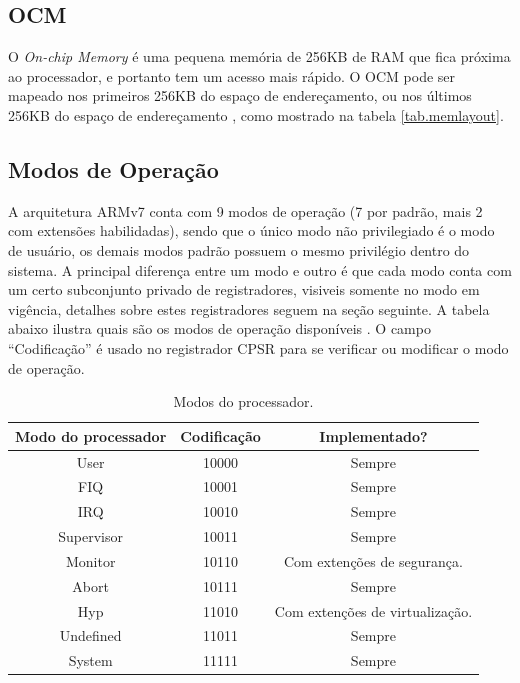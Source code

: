 \documentclass{ufscThesis/ufscThesis} %
\begin{document}
\subsection{OCM} O \emph{On-chip Memory} é uma pequena memória de 256KB de RAM que fica próxima ao processador, e portanto tem um acesso mais rápido. O OCM pode ser mapeado nos primeiros 256KB do espaço de endereçamento, ou nos últimos 256KB do espaço de endereçamento \cite{ug585}, como mostrado na tabela \ref{tab.memlayout}.


\subsection{Modos de Operação}
\label{sec:operating_modes}
A arquitetura ARMv7 conta com 9 modos de operação (7 por padrão, mais 2 com extensões habilidadas), sendo que o único modo não privilegiado é o modo de usuário, os demais modos padrão possuem o mesmo privilégio dentro do sistema. A principal diferença entre um modo e outro é que cada modo conta com um certo subconjunto privado de registradores, visiveis somente no modo em vigência, detalhes sobre estes registradores seguem na seção seguinte. A tabela abaixo ilustra quais são os modos de operação disponíveis \cite[p.~1139]{armarm}.
O campo ``Codificação'' é usado no registrador CPSR para se verificar ou modificar o modo de operação.

\begin{table}[ht]
\centering
\begin{tabular}{ccc}
\hline\hline                        %
Modo do processador  & Codificação & Implementado?\\ [0.5ex] %
\hline                  %
User & 10000 & Sempre \\
FIQ & 10001 & Sempre \\
IRQ & 10010 & Sempre \\
Supervisor & 10011 & Sempre\\
Monitor & 10110 & Com extenções de segurança.\\
Abort & 10111 & Sempre\\
Hyp & 11010 & Com extenções de virtualização.\\
Undefined & 11011 & Sempre\\
System & 11111 & Sempre\\[1ex]
\hline %
\end{tabular}
\caption{Modos do processador.}
\label{tab.processormode} %
\end{table}
\end{document}
